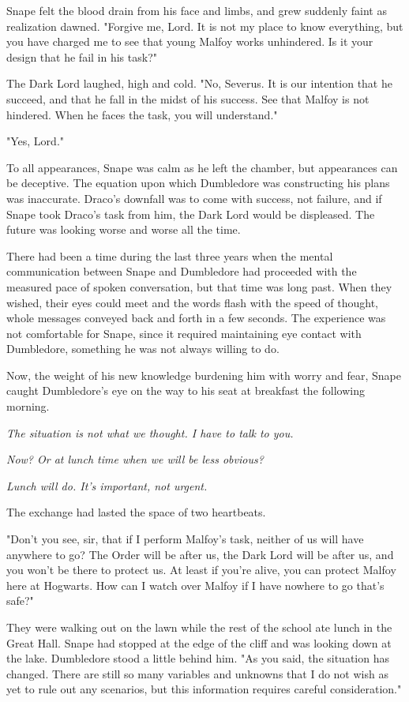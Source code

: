 Snape felt the blood drain from his face and limbs, and grew suddenly faint as realization dawned. "Forgive me, Lord. It is not my place to know everything, but you have charged me to see that young Malfoy works unhindered. Is it your design that he fail in his task?"

The Dark Lord laughed, high and cold. "No, Severus. It is our intention that he succeed, and that he fall in the midst of his success. See that Malfoy is not hindered. When he faces the task, you will understand."

"Yes, Lord."

To all appearances, Snape was calm as he left the chamber, but appearances can be deceptive. The equation upon which Dumbledore was constructing his plans was inaccurate. Draco's downfall was to come with success, not failure, and if Snape took Draco's task from him, the Dark Lord would be{\el} displeased. The future was looking worse and worse all the time.

There had been a time during the last three years when the mental communication between Snape and Dumbledore had proceeded with the measured pace of spoken conversation, but that time was long past. When they wished, their eyes could meet and the words flash with the speed of thought, whole messages conveyed back and forth in a few seconds. The experience was not comfortable for Snape, since it required maintaining eye contact with Dumbledore, something he was not always willing to do.

Now, the weight of his new knowledge burdening him with worry and fear, Snape caught Dumbledore's eye on the way to his seat at breakfast the following morning.

\emph{The situation is not what we thought. I have to talk to you.}

\emph{Now? Or at lunch time when we will be less obvious?}

\emph{Lunch will do. It's important, not urgent.}

The exchange had lasted the space of two heartbeats.

\sbreak

"Don't you see, sir, that if I perform Malfoy's task, neither of us will have anywhere to go? The Order will be after us, the Dark Lord will be after us, and you won't be there to protect us. At least if you're alive, you can protect Malfoy here at Hogwarts. How can I watch over Malfoy if I have nowhere to go that's safe?"

They were walking out on the lawn while the rest of the school ate lunch in the Great Hall. Snape had stopped at the edge of the cliff and was looking down at the lake. Dumbledore stood a little behind him. "As you said, the situation has changed. There are still so many variables and unknowns that I do not wish as yet to rule out any scenarios, but this information requires careful consideration."

